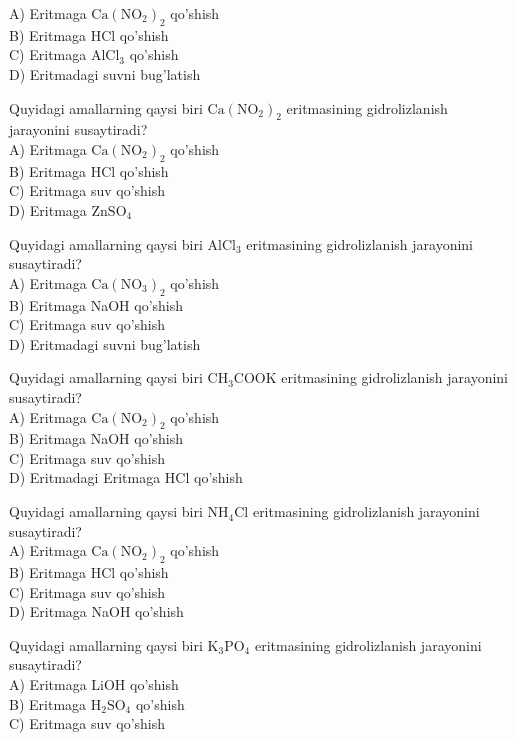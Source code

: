 A) Eritmaga $\mathrm{Ca}\left(\mathrm{NO}_{2}\right)_{2}$ qo'shish\\
B) Eritmaga HCl qo'shish\\
C) Eritmaga $\mathrm{AlCl}_{3}$ qo'shish\\
D) Eritmadagi suvni bug'latish
  \item Quyidagi amallarning qaysi biri $\mathrm{Ca}\left(\mathrm{NO}_{2}\right)_{2}$ eritmasining gidrolizlanish jarayonini susaytiradi?\\
A) Eritmaga $\mathrm{Ca}\left(\mathrm{NO}_{2}\right)_{2}$ qo'shish\\
B) Eritmaga HCl qo'shish\\
C) Eritmaga suv qo'shish\\
D) Eritmaga $\mathrm{ZnSO}_{4}$
  \item Quyidagi amallarning qaysi biri $\mathrm{AlCl}_{3}$ eritmasining gidrolizlanish jarayonini susaytiradi?\\
A) Eritmaga $\mathrm{Ca}\left(\mathrm{NO}_{3}\right)_{2}$ qo'shish\\
B) Eritmaga NaOH qo'shish\\
C) Eritmaga suv qo'shish\\
D) Eritmadagi suvni bug'latish
  \item Quyidagi amallarning qaysi biri $\mathrm{CH}_{3} \mathrm{COOK}$ eritmasining gidrolizlanish jarayonini susaytiradi?\\
A) Eritmaga $\mathrm{Ca}\left(\mathrm{NO}_{2}\right)_{2}$ qo'shish\\
B) Eritmaga NaOH qo'shish\\
C) Eritmaga suv qo'shish\\
D) Eritmadagi Eritmaga HCl qo'shish
  \item Quyidagi amallarning qaysi biri $\mathrm{NH}_{4} \mathrm{Cl}$ eritmasining gidrolizlanish jarayonini susaytiradi?\\
A) Eritmaga $\mathrm{Ca}\left(\mathrm{NO}_{2}\right)_{2}$ qo'shish\\
B) Eritmaga HCl qo'shish\\
C) Eritmaga suv qo'shish\\
D) Eritmaga NaOH qo'shish
  \item Quyidagi amallarning qaysi biri $\mathrm{K}_{3} \mathrm{PO}_{4}$ eritmasining gidrolizlanish jarayonini susaytiradi?\\
A) Eritmaga LiOH qo'shish\\
B) Eritmaga $\mathrm{H}_{2} \mathrm{SO}_{4}$ qo'shish\\
C) Eritmaga suv qo'shish\\
